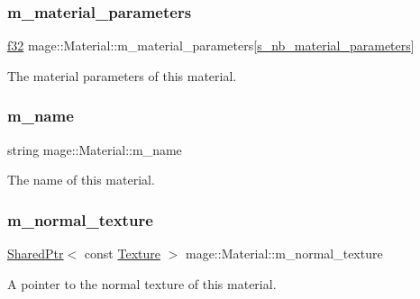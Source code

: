 \subsubsection{\texorpdfstring{m\+\_\+material\+\_\+parameters}{m\_material\_parameters}}
{\footnotesize\ttfamily \hyperlink{namespacemage_a6a44ad388483959dc4dff9f2aef91431}{f32} mage\+::\+Material\+::m\+\_\+material\+\_\+parameters\mbox{[}\hyperlink{structmage_1_1_material_a06d6d7b7243ea8acce9445b501816d78}{s\+\_\+nb\+\_\+material\+\_\+parameters}\mbox{]}\hspace{0.3cm}{\ttfamily [private]}}

The material parameters of this material. \hypertarget{structmage_1_1_material_a2b3e839a8ae093d53b12529d61ec6605}{}\label{structmage_1_1_material_a2b3e839a8ae093d53b12529d61ec6605} 
\subsubsection{\texorpdfstring{m\+\_\+name}{m\_name}}
{\footnotesize\ttfamily string mage\+::\+Material\+::m\+\_\+name\hspace{0.3cm}{\ttfamily [private]}}

The name of this material. \hypertarget{structmage_1_1_material_adc2d9d68524a55262bd0f4832880b10b}{}\label{structmage_1_1_material_adc2d9d68524a55262bd0f4832880b10b} 
\subsubsection{\texorpdfstring{m\+\_\+normal\+\_\+texture}{m\_normal\_texture}}
{\footnotesize\ttfamily \hyperlink{namespacemage_a1e01ae66713838a7a67d30e44c67703e}{Shared\+Ptr}$<$ const \hyperlink{classmage_1_1_texture}{Texture} $>$ mage\+::\+Material\+::m\+\_\+normal\+\_\+texture\hspace{0.3cm}{\ttfamily [private]}}

A pointer to the normal texture of this material. \hypertarget{structmage_1_1_material_a45587388f4ff57c209de2280b71af9d3}{}\label{structmage_1_1_material_a45587388f4ff57c209de2280b71af9d3} 
